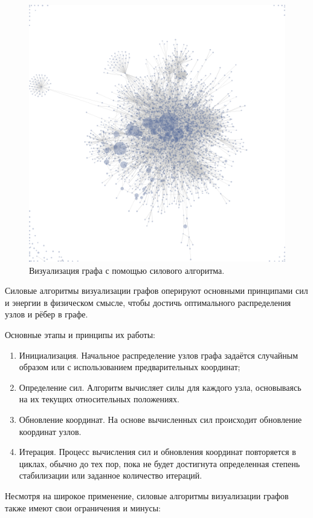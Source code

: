 \documentclass[14pt, russian]{scrartcl}
\begin{document}
\begin{figure}[H]
\centering
  \begin{minipage}[t]{.8\textwidth}
  \centering
\includegraphics[width=.7\textwidth]{./imgs/force-directed-example.png}
  \end{minipage}
\caption{Визуализация графа с помощью силового алгоритма.}
\label{fig:force_directed_example}
\end{figure}

Силовые алгоритмы визуализации графов оперируют основными принципами сил и энергии в физическом смысле, чтобы достичь оптимального распределения узлов и рёбер в графе.

Основные этапы и принципы их работы:

\begin{enumerate}
	\item Инициализация. Начальное распределение узлов графа задаётся случайным образом или с использованием предварительных координат;
	\item Определение сил. Алгоритм вычисляет силы для каждого узла, основываясь на их текущих относительных положениях.
	\item Обновление координат. На основе вычисленных сил происходит обновление координат узлов.
	\item Итерация. Процесс вычисления сил и обновления координат повторяется в циклах, обычно до тех пор, пока не будет достигнута определенная степень стабилизации или заданное количество итераций.
\end{enumerate}

Несмотря на  широкое применение, силовые алгоритмы визуализации графов также имеют свои ограничения и минусы:
\end{document}
